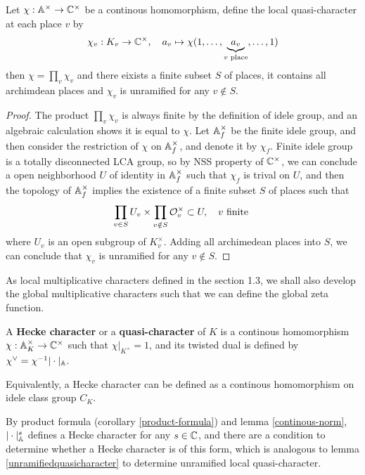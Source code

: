 \begin{lemma}
    Let \(\chi: \mathbb{A}^\times \to \mathbb{C}^\times\) be a continous homomorphism, define the local quasi-character at each place \(v\) by
    \[\chi_v : K_v \to \mathbb{C}^\times, \quad a_v \mapsto \chi(1,\dots,\underbrace{a_v}_{v \text{ place}},\dots,1)\]
    then \(\chi = \prod_v \chi_v\) and there eixists a finite subset \(S\) of places, it contains all archimdean places and \(\chi_v\) is unramified for any \(v \notin S\).
\end{lemma}

\begin{proof}
    The product \(\prod_v\chi_v\) is always finite by the definition of idele group, and an algebraic calculation shows it is equal to \(\chi\). Let \(\mathbb{A}_f^{\times}\) be the finite idele group, and then consider the restriction of \(\chi \) on \(\mathbb{A}_f^\times\), and denote it by \(\chi_f\). Finite idele group is a totally disconnected LCA group, so by NSS property of \(\mathbb{C}^\times\), we can conclude a open neighborhood \(U\) of identity in \(\mathbb{A}^\times_f\) such that \(\chi_f\) is trival on \(U\), and then the topology of \(\mathbb{A}_f^\times\) implies the existence of a finite subset \(S\) of places such that 
    \[\prod_{v \in S}U_v \times \prod_{v \notin S} \mathcal{O}_v^\times \subset U ,\quad v \text{ finite }\]
    where \(U_v\) is an open subgroup of \(K_v^\times\). Adding all archimedean places into \(S\), we can conclude that \(\chi_v\) is unramified for any \(v \notin S\).
\end{proof}

As local multiplicative characters defined in the section 1.3, we shall also develop the global multiplicative characters such that we can define the global zeta function.

\begin{definition}
    A \textbf{Hecke character} or a \textbf{quasi-character} of \(K\) is a continous homomorphism \(\chi: \mathbb{A}_K^\times \to \mathbb{C}^\times\) such that \(\chi|_{K^\times} = 1\), and its twisted dual is defined by \(\chi^\vee = \chi^{-1} |\cdot|_{\mathbb{A}}\). 
\end{definition}

\begin{remark}
    Equivalently, a Hecke character can be defined as a continous homomorphism on idele class group \(C_K\).
\end{remark}

By product formula (corollary \ref{product-formula}) and lemma \ref{continous-norm},  \(|\cdot|^s_{\mathbb{A}}\) defines a Hecke character for any \(s \in \mathbb{C}\), and there are a condition to determine whether a Hecke character is of this form, which is analogous to lemma \ref{unramifiedquasicharacter} to determine unramified local quasi-character.

